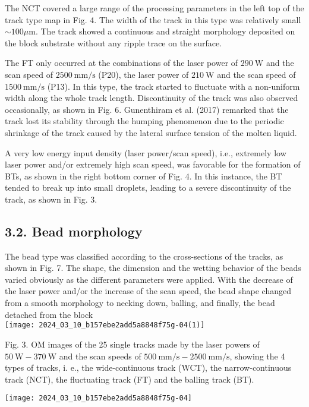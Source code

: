 \documentclass[10pt]{article}
\begin{document}
The NCT covered a large range of the processing parameters in the left top of the track type map in Fig. 4. The width of the track in this type was relatively small $\sim 100 \mu \mathrm{m}$. The track showed a continuous and straight morphology deposited on the block substrate without any ripple trace on the surface.

The FT only occurred at the combinations of the laser power of $290 \mathrm{~W}$ and the scan speed of $2500 \mathrm{~mm} / \mathrm{s}$ (P20), the laser power of $210 \mathrm{~W}$ and the scan speed of $1500 \mathrm{~mm} / \mathrm{s}$ (P13). In this type, the track started to fluctuate with a non-uniform width along the whole track length. Discontinuity of the track was also observed occasionally, as shown in Fig. 6. Gunenthiram et al. (2017) remarked that the track lost its stability through the humping phenomenon due to the periodic shrinkage of the track caused by the lateral surface tension of the molten liquid.

A very low energy input density (laser power/scan speed), i.e., extremely low laser power and/or extremely high scan speed, was favorable for the formation of BTs, as shown in the right bottom corner of Fig. 4. In this instance, the BT tended to break up into small droplets, leading to a severe discontinuity of the track, as shown in Fig. 3.

\subsection*{3.2. Bead morphology}
The bead type was classified according to the cross-sections of the tracks, as shown in Fig. 7. The shape, the dimension and the wetting behavior of the beads varied obviously as the different parameters were applied. With the decrease of the laser power and/or the increase of the scan speed, the bead shape changed from a smooth morphology to necking down, balling, and finally, the bead detached from the block\\
\texttt{[image: 2024\_03\_10\_b157ebe2add5a8848f75g-04(1)]}

Fig. 3. OM images of the 25 single tracks made by the laser powers of $50 \mathrm{~W}-370 \mathrm{~W}$ and the scan speeds of $500 \mathrm{~mm} / \mathrm{s}-2500 \mathrm{~mm} / \mathrm{s}$, showing the 4 types of tracks, $\mathrm{i}$. e., the wide-continuous track (WCT), the narrow-continuous track (NCT), the fluctuating track (FT) and the balling track (BT).

\begin{center}
\texttt{[image: 2024\_03\_10\_b157ebe2add5a8848f75g-04]}
\end{center}
\end{document}

